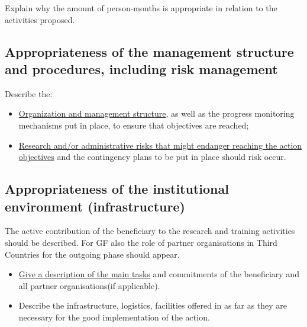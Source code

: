 \medskip\noindent
Explain why the amount of person-months is appropriate in relation to the activities proposed.





\subsection{Appropriateness of the management structure and procedures, including risk management}
\label{sec:implementation_management}

Describe the: 

\begin{itemize}
  \item \ul{Organization and management structure}, as well as the progress monitoring mechanisms put in place, to ensure that objectives are reached; 
  \item \ul{Research and/or administrative risks that might endanger reaching the action objectives} and the contingency plans to be put in place should risk occur.  
\end{itemize}





\subsection{Appropriateness of the institutional environment (infrastructure)}
\label{sec:implementation_infrastructure}

The active contribution of the beneficiary to the research and training activities should be described. 
For GF also the role of partner organisations in Third Countries for the outgoing phase should appear. 

\begin{itemize}
  \item \ul{Give a description of the main tasks} and commitments of the beneficiary and all partner organisations(if applicable).
  \item Describe the infrastructure, logistics, facilities offered in as far as they are necessary for the good implementation of the action.
\end{itemize}





\markEndPageLimit
